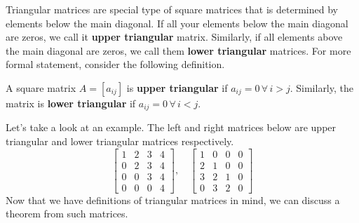 \documentclass[../main.tex]{subfiles}
\begin{document}
Triangular matrices are special type of square matrices that is
determined by elements below the main diagonal. If all your
elements below the main diagonal are zeros, we call it
\textbf{upper triangular} matrix. Similarly, if all elements above
the main diagonal are zeros, we call them \textbf{lower triangular}
matrices. For more formal statement, consider the following
definition.

\begin{definition}
A square matrix $A = [a_{ij}]$ is \textbf{upper triangular} if
$a_{ij} = 0 \, \forall \, i > j$. Similarly, the matrix is
\textbf{lower triangular} if $a_{ij} = 0 \, \forall \, i < j$.
\end{definition}

Let's take a look at an example. The left and right matrices below
are upper triangular and lower triangular matrices respectively.
\[
\begin{bmatrix}
    1 & 2 & 3 & 4 \\
    0 & 2 & 3 & 4 \\
    0 & 0 & 3 & 4 \\
    0 & 0 & 0 & 4
\end{bmatrix},
\quad
\begin{bmatrix}
    1 & 0 & 0 & 0 \\
    2 & 1 & 0 & 0 \\
    3 & 2 & 1 & 0 \\
    0 & 3 & 2 & 0
\end{bmatrix}
\]
Now that we have definitions of triangular matrices in mind,
we can discuss a theorem from such matrices.
\end{document}
